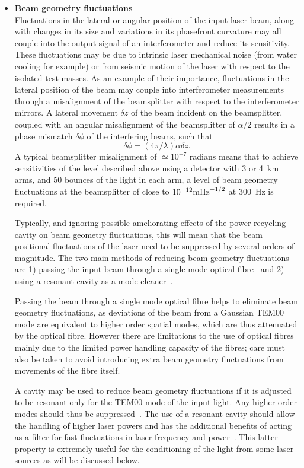 \documentclass{article}
\begin{document}
\begin{itemize}
\item {\bf Beam geometry fluctuations} \\
Fluctuations in the lateral or angular position of the input laser beam, along
with changes in its size and variations in its phasefront curvature may all
couple into the output signal of an interferometer and reduce its sensitivity.
These fluctuations may be due to intrinsic laser mechanical noise (from water
cooling for example) or from seismic motion of the laser with respect to the
isolated test masses. As an example of their importance, fluctuations in the
lateral position of the beam may couple into interferometer measurements through
a misalignment of the beamsplitter with respect to the interferometer mirrors. A
lateral movement $\delta z$ of the beam incident on the beamsplitter, coupled
with an angular misalignment of the beamsplitter of $\alpha/2$ results in a
phase mismatch $\delta \phi$ of the interfering beams, such that~\cite{Rudiger}
%
\begin{equation}
  \delta \phi = (4 \pi/\lambda) \alpha \delta z.
  \label{equation:beamgeomfluc}
\end{equation}
%
A typical beamsplitter misalignment of $\simeq 10^{-7}$ radians means that to
achieve sensitivities of the level described above using a detector with 3 or
4~km arms, and 50 bounces of the light in each arm, a level of beam geometry
fluctuations at the beamsplitter of close to $10^{-12}{\rm m}{\rm Hz}^{-1/2}$ at
300~Hz is required.

Typically, and ignoring possible ameliorating effects of the power recycling
cavity on beam geometry fluctuations, this will mean that the beam positional
fluctuations of the laser need to be suppressed by several orders of magnitude.
The two main methods of reducing beam geometry fluctuations are 1) passing the
input beam through a single mode optical fibre~\cite{Meersphd} and 2) using a
resonant cavity as a mode cleaner~\cite{Rudiger, Skeldon, Willke, Araya}.

Passing the beam through a single mode optical fibre helps to eliminate beam
geometry fluctuations, as deviations of the beam from a Gaussian TEM00 mode are
equivalent to higher order spatial modes, which are thus attenuated by the
optical fibre.  However there are limitations to the use of optical fibres
mainly due to the limited power handling capacity of the fibres; care must also
be taken to avoid introducing extra beam geometry fluctuations from movements of
the fibre itself.

A cavity may be used to reduce beam geometry fluctuations if it is adjusted to
be resonant only for the TEM00 mode of the input light. Any higher order modes
should thus be suppressed~\cite{Rudiger}. The use of a resonant cavity should
allow the handling of higher laser powers and has the additional benefits of
acting as a filter for fast fluctuations in laser frequency and
power~\cite{Skeldon, Willke}. This latter property is extremely useful for the
conditioning of the light from some laser sources as will be discussed below.
\end{itemize}
\end{document}
